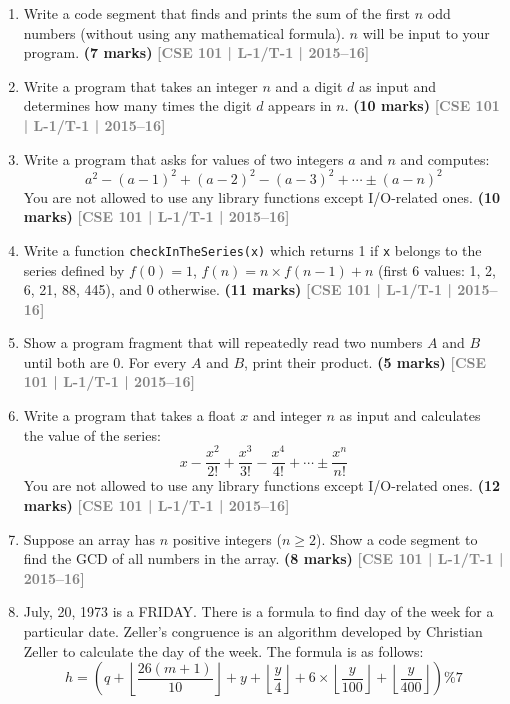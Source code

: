 \documentclass[12pt,a3paper]{article}
\newcommand{\yr}[1]{\hfill\textcolor{gray}{\small\textbf{[#1]}}}
\newcommand{\mk}[1]{\textcolor{orange!70!black}{\small\textbf{(#1 marks)}}}
\begin{document}
\begin{enumerate}
\item Write a code segment that finds and prints the sum of the first $n$ odd numbers (without using any mathematical formula). $n$ will be input to your program.
\mk{7} \yr{CSE 101 | L-1/T-1 | 2015--16}

\item Write a program that takes an integer $n$ and a digit $d$ as input and determines how many times the digit $d$ appears in $n$.
\mk{10} \yr{CSE 101 | L-1/T-1 | 2015--16}

\item Write a program that asks for values of two integers $a$ and $n$ and computes:
\[ a^2 - (a-1)^2 + (a-2)^2 - (a-3)^2 + \cdots \pm (a-n)^2 \]
You are not allowed to use any library functions except I/O-related ones.
\mk{10} \yr{CSE 101 | L-1/T-1 | 2015--16}

\item Write a function \texttt{checkInTheSeries(x)} which returns 1 if \texttt{x} belongs to the series defined by $f(0)=1$, $f(n)=n\times f(n-1)+n$ (first 6 values: 1, 2, 6, 21, 88, 445), and 0 otherwise.
\mk{11} \yr{CSE 101 | L-1/T-1 | 2015--16}

\item Show a program fragment that will repeatedly read two numbers $A$ and $B$ until both are 0. For every $A$ and $B$, print their product.
\mk{5} \yr{CSE 101 | L-1/T-1 | 2015--16}

\item Write a program that takes a float $x$ and integer $n$ as input and calculates the value of the series:
\[ x - \frac{x^2}{2!} + \frac{x^3}{3!} - \frac{x^4}{4!} + \cdots \pm \frac{x^n}{n!} \]
You are not allowed to use any library functions except I/O-related ones.
\mk{12} \yr{CSE 101 | L-1/T-1 | 2015--16}

\item Suppose an array has $n$ positive integers ($n \ge 2$). Show a code segment to find the GCD of all numbers in the array.
\mk{8} \yr{CSE 101 | L-1/T-1 | 2015--16}

\item 
July, 20, 1973 is a FRIDAY. There is a formula to find day of the week for a particular date. Zeller's congruence is an algorithm developed by Christian Zeller to calculate the day of the week. The formula is as follows:
\[ h = \left( q + \left\lfloor \frac{26(m+1)}{10} \right\rfloor + y + \left\lfloor \frac{y}{4} \right\rfloor + 6 \times \left\lfloor \frac{y}{100} \right\rfloor + \left\lfloor \frac{y}{400} \right\rfloor \right) \% 7 \]


\end{enumerate}
\end{document}

